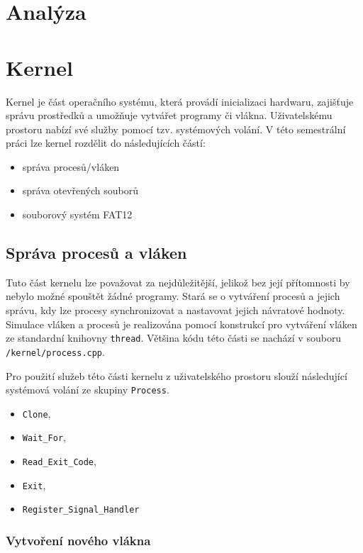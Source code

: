\documentclass[12pt, a4paper]{article}
\let\oldsection\section
\renewcommand\section{\clearpage\oldsection}
\begin{document}
    \tableofcontents
    \pagebreak

    
    \section{Analýza}

    \section{Kernel}

    Kernel je část operačního systému, která provádí inicializaci hardwaru, zajišťuje správu prostředků a umožňuje vytvářet programy či vlákna. Uživatelskému prostoru nabízí své služby pomocí tzv. systémových volání. V této semestrální práci lze kernel rozdělit do následujících částí: 
\begin{itemize}
    \item správa procesů/vláken
    \item správa otevřených souborů
    \item souborový systém FAT12
\end{itemize}

\subsection{Správa procesů a vláken}
Tuto část kernelu lze považovat za nejdůležitější, jelikož bez její přítomnosti by nebylo možné spouštět žádné programy. Stará se o vytváření procesů a jejich správu, kdy lze procesy synchronizovat a nastavovat jejich návratové hodnoty. Simulace vláken a procesů je realizována pomocí konstrukcí pro vytváření vláken ze standardní knihovny \texttt{thread}. Většina kódu této části se nachází v souboru \texttt{/kernel/process.cpp}.

Pro použití služeb této části kernelu z uživatelského prostoru slouží následující systémová volání ze skupiny \texttt{Process}.

\begin{itemize}
    \item \texttt{Clone},
    \item \texttt{Wait\_For},
    \item \texttt{Read\_Exit\_Code},
    \item \texttt{Exit},
    \item \texttt{Register\_Signal\_Handler}
\end{itemize}

\subsubsection{Vytvoření nového vlákna}
\end{document}
